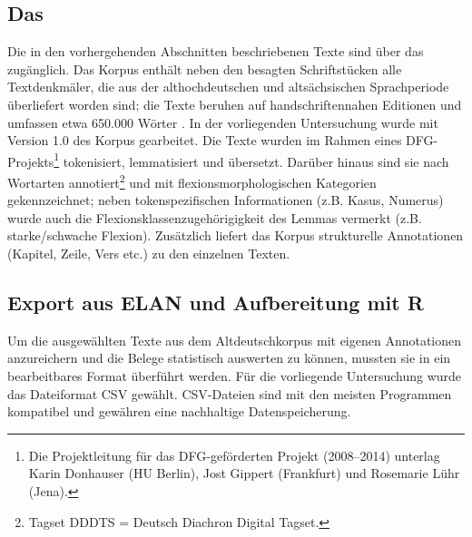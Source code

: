 \subsection{Das } \label{sec:ddd}

Die in den vorhergehenden Abschnitten beschriebenen Texte sind über das  \parencite{Donhauser2015} zugänglich. Das Korpus enthält neben den besagten Schriftstücken alle Textdenkmäler, die aus der althochdeutschen und altsächsischen Sprachperiode überliefert worden sind; die Texte beruhen auf handschriftennahen Editionen und umfassen etwa 650.000 Wörter \parencite[s. auch][522--323]{Dipper2015}. In der vorliegenden Untersuchung wurde mit  Version 1.0 des Korpus gearbeitet. 
Die Texte wurden im Rahmen eines DFG-Projekts\footnote{Die Projektleitung für das DFG-geförderten Projekt (2008--2014) unterlag Karin Donhauser (HU Berlin), Jost Gippert (Frankfurt) und Rosemarie Lühr (Jena).} tokenisiert, lemmatisiert und übersetzt. Darüber hinaus sind sie nach Wortarten annotiert\footnote{Tagset DDDTS = Deutsch Diachron Digital Tagset.} und mit flexionsmorphologischen Kategorien gekennzeichnet; neben tokenspezifischen Informationen (z.B. Kasus, Numerus) wurde auch die Flexionsklassenzugehörigigkeit des Lemmas vermerkt (z.B. starke/schwache Flexion). Zusätzlich liefert das Korpus strukturelle Annotationen (Kapitel, Zeile, Vers etc.) zu den einzelnen Texten. 


\subsection{Export aus ELAN und Aufbereitung mit R}\label{sec:aufbereitung}

Um die ausgewählten Texte aus dem Altdeutschkorpus mit eigenen Annotationen anzureichern und die Belege  statistisch auswerten zu können, mussten sie in ein bearbeitbares Format überführt werden. Für die vorliegende Untersuchung wurde das Dateiformat CSV gewählt. CSV-Dateien sind mit den meisten Programmen kompatibel und gewähren eine nachhaltige Datenspeicherung. 

